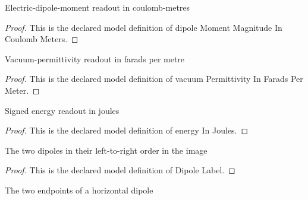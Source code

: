 \begin{definition}
  \label{def:physics:phyx-mini-0522:phyxminiproblems-problemphyxmini0522-dipolemomentmagnitudeincoulombmeters}
  Electric-dipole-moment readout in coulomb-metres
\end{definition}
\begin{proof}
  This is the declared model definition of dipole Moment Magnitude In Coulomb Meters.
\end{proof}
\begin{definition}
  \label{def:physics:phyx-mini-0522:phyxminiproblems-problemphyxmini0522-vacuumpermittivityinfaradspermeter}
  Vacuum-permittivity readout in farads per metre
\end{definition}
\begin{proof}
  This is the declared model definition of vacuum Permittivity In Farads Per Meter.
\end{proof}
\begin{definition}
  \label{def:physics:phyx-mini-0522:phyxminiproblems-problemphyxmini0522-energyinjoules}
  Signed energy readout in joules
\end{definition}
\begin{proof}
  This is the declared model definition of energy In Joules.
\end{proof}
\begin{definition}
  \label{def:physics:phyx-mini-0522:phyxminiproblems-problemphyxmini0522-dipolelabel}
  The two dipoles in their left-to-right order in the image
\end{definition}
\begin{proof}
  This is the declared model definition of Dipole Label.
\end{proof}
\begin{definition}
  \label{def:physics:phyx-mini-0522:phyxminiproblems-problemphyxmini0522-dipoleend}
  The two endpoints of a horizontal dipole
\end{definition}

